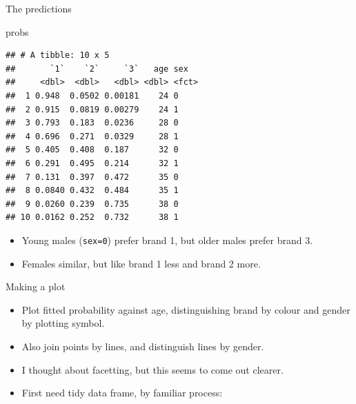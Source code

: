 \documentclass[
  ignorenonframetext,
]{beamer}
\newenvironment{Shaded}{\begin{snugshade}}{\end{snugshade}}
\newcommand{\KeywordTok}[1]{\textcolor[rgb]{0.13,0.29,0.53}{\textbf{#1}}}
\newcommand{\NormalTok}[1]{#1}
\newcommand{\OperatorTok}[1]{\textcolor[rgb]{0.81,0.36,0.00}{\textbf{#1}}}
\newcommand{\StringTok}[1]{\textcolor[rgb]{0.31,0.60,0.02}{#1}}
\begin{document}
\begin{frame}[fragile]{The predictions}
\protect\hypertarget{the-predictions}{}

\small

\begin{Shaded}
\begin{Highlighting}[]
\NormalTok{probs}
\end{Highlighting}
\end{Shaded}

\begin{verbatim}
## # A tibble: 10 x 5
##       `1`    `2`     `3`   age sex  
##     <dbl>  <dbl>   <dbl> <dbl> <fct>
##  1 0.948  0.0502 0.00181    24 0    
##  2 0.915  0.0819 0.00279    24 1    
##  3 0.793  0.183  0.0236     28 0    
##  4 0.696  0.271  0.0329     28 1    
##  5 0.405  0.408  0.187      32 0    
##  6 0.291  0.495  0.214      32 1    
##  7 0.131  0.397  0.472      35 0    
##  8 0.0840 0.432  0.484      35 1    
##  9 0.0260 0.239  0.735      38 0    
## 10 0.0162 0.252  0.732      38 1
\end{verbatim}

\normalsize

\begin{itemize}
\item
  Young males (\texttt{sex=0}) prefer brand 1, but older males prefer
  brand 3.
\item
  Females similar, but like brand 1 less and brand 2 more.
\end{itemize}

\end{frame}

\begin{frame}[fragile]{Making a plot}
\protect\hypertarget{making-a-plot}{}

\begin{itemize}
\item
  Plot fitted probability against age, distinguishing brand by colour
  and gender by plotting symbol.
\item
  Also join points by lines, and distinguish lines by gender.
\item
  I thought about facetting, but this seems to come out clearer.
\item
  First need tidy data frame, by familiar process:
\end{itemize}

\begin{Shaded}
\end{Shaded}

\end{frame}
\end{document}
